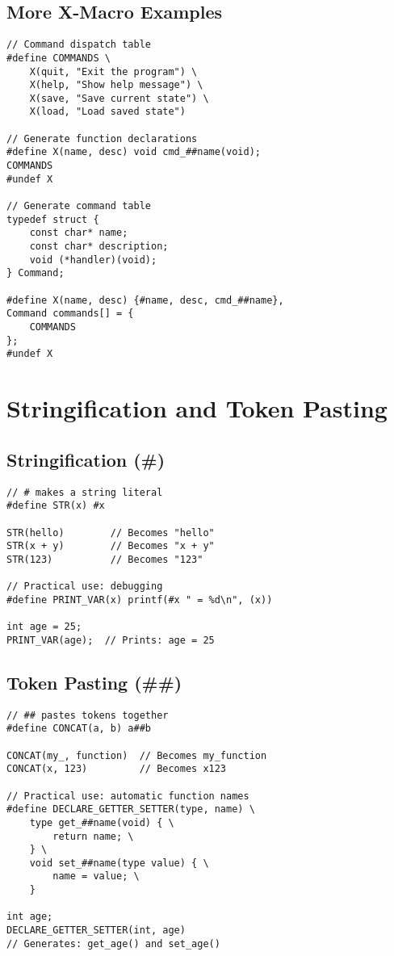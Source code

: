 \subsection{More X-Macro Examples}

\begin{lstlisting}
// Command dispatch table
#define COMMANDS \
    X(quit, "Exit the program") \
    X(help, "Show help message") \
    X(save, "Save current state") \
    X(load, "Load saved state")

// Generate function declarations
#define X(name, desc) void cmd_##name(void);
COMMANDS
#undef X

// Generate command table
typedef struct {
    const char* name;
    const char* description;
    void (*handler)(void);
} Command;

#define X(name, desc) {#name, desc, cmd_##name},
Command commands[] = {
    COMMANDS
};
#undef X
\end{lstlisting}

\section{Stringification and Token Pasting}

\subsection{Stringification (\#)}

\begin{lstlisting}
// # makes a string literal
#define STR(x) #x

STR(hello)        // Becomes "hello"
STR(x + y)        // Becomes "x + y"
STR(123)          // Becomes "123"

// Practical use: debugging
#define PRINT_VAR(x) printf(#x " = %d\n", (x))

int age = 25;
PRINT_VAR(age);  // Prints: age = 25
\end{lstlisting}

\subsection{Token Pasting (\#\#)}

\begin{lstlisting}
// ## pastes tokens together
#define CONCAT(a, b) a##b

CONCAT(my_, function)  // Becomes my_function
CONCAT(x, 123)         // Becomes x123

// Practical use: automatic function names
#define DECLARE_GETTER_SETTER(type, name) \
    type get_##name(void) { \
        return name; \
    } \
    void set_##name(type value) { \
        name = value; \
    }

int age;
DECLARE_GETTER_SETTER(int, age)
// Generates: get_age() and set_age()
\end{lstlisting}

